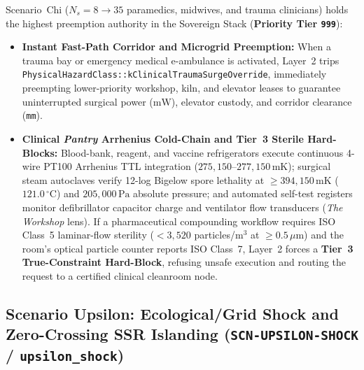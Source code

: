 Scenario~Chi ($N_s = 8 \to 35$ paramedics, midwives, and trauma clinicians) holds the highest preemption authority in the Sovereign Stack (\textbf{Priority Tier \texttt{999}}):
\begin{itemize}
    \item \textbf{Instant Fast-Path Corridor and Microgrid Preemption:} When a trauma bay or emergency medical e-ambulance is activated, Layer~2 trips \texttt{PhysicalHazardClass::kClinicalTraumaSurgeOverride}, immediately preempting lower-priority workshop, kiln, and elevator leases to guarantee uninterrupted surgical power ($\mathrm{mW}$), elevator custody, and corridor clearance (\texttt{mm}).
    \item \textbf{Clinical \textit{Pantry} Arrhenius Cold-Chain and Tier~3 Sterile Hard-Blocks:} Blood-bank, reagent, and vaccine refrigerators execute continuous 4-wire PT100 Arrhenius TTL integration ($275{,}150\text{--}277{,}150\,\mathrm{mK}$); surgical steam autoclaves verify 12-log Bigelow spore lethality at $\ge 394{,}150\,\mathrm{mK}$ ($121.0\,^\circ\mathrm{C}$) and $205{,}000\,\mathrm{Pa}$ absolute pressure; and automated self-test registers monitor defibrillator capacitor charge and ventilator flow transducers (\textit{The Workshop} lens). If a pharmaceutical compounding workflow requires ISO Class~5 laminar-flow sterility ($< 3{,}520$ particles/$\mathrm{m^3}$ at $\ge 0.5\,\mu\mathrm{m}$) and the room's optical particle counter reports ISO Class~7, Layer~2 forces a \textbf{Tier~3 True-Constraint Hard-Block}, refusing unsafe execution and routing the request to a certified clinical cleanroom node.
\end{itemize}

\subsection{Scenario Upsilon: Ecological/Grid Shock and Zero-Crossing SSR Islanding (\texttt{SCN-UPSILON-SHOCK} / \texttt{upsilon\_shock})}

